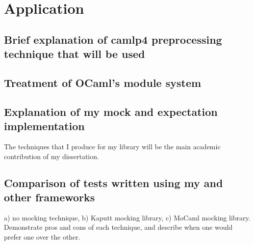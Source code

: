 \chapter{Application}

\section{Brief explanation of camlp4 preprocessing technique that will be used}

\section{Treatment of OCaml's module system}

\section{Explanation of my mock and expectation implementation}

The techniques that I produce for my library will be the main academic
contribution of my dissertation.

\section{Comparison of tests written using my and other frameworks}

a) no mocking technique, b) Kaputt mocking library, c) MoCaml mocking
library. Demonstrate pros and cons of each technique, and describe
when one would prefer one over the other.
